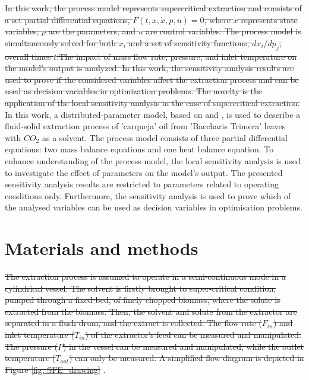 \documentclass[a4paper,fleqn]{cas-dc}
\begin{document}
\sout{In this work, the process model represents supercritical extraction and consists of a set partial differential equations, $F(t,x,\dot{x},p,u)=0$, where $x$ represents state variables, $p$ are the parameters, and $u$ are control variables. The process model is simultaneously solved for both $x_i$ and a set of sensitivity functions, $dx_i/dp_j$, overall times $t$.The impact of mass flow rate, pressure, and inlet temperature on the model's output is analyzed. In this work, the sensitivity analysis results are used to prove if the considered variables affect the extraction process and can be used as decision variables in optimization problems. The novelty is the application of the local sensitivity analysis in the case of supercritical extraction.}
{\color{blue}In this work, a distributed-parameter model, based on \citet{Reverchon1996} and \citet{Vargas2006}, is used to describe a fluid-solid extraction process of 'carqueja' oil from 'Baccharis Trimera' leaves with $CO_2$ as a solvent. The process model consists of three partial differential equations: two mass balance equations and one heat balance equation. To enhance understanding of the process model, the local sensitivity analysis is used to investigate the effect of parameters on the model's output. The presented sensitivity analysis results are restricted to parameters related to operating conditions only. Furthermore, the sensitivity analysis is used to prove which of the analysed variables can be used as decision variables in optimisation problems.}

\section{Materials and methods} \label{CH: Materials and methods}
\sout{The extraction process is assumed to operate in a semi-continuous mode in a cylindrical vessel. The solvent is firstly brought to super-critical condition, pumped through a fixed-bed, of finely chopped biomass, where the solute is extracted from the biomass. Then, the solvent and solute from the extractor are separated in a flush drum, and the extract is collected. The flow rate ($F_{in}$) and inlet temperature ($T_{in}$) of the extractor’s feed can be measured and manipulated. The pressure ($P$) in the vessel can be measured and manipulated, while the outlet temperature ($T_{out}$) can only be measured. A simplified flow diagram is depicted in Figure \ref{fig: SFE_drawing} }.
\end{document}
